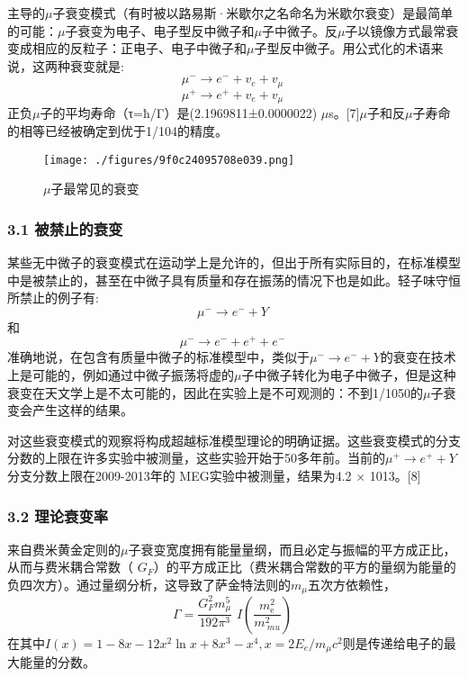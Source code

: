 主导的$\mu$子衰变模式（有时被以路易斯·米歇尔之名命名为米歇尔衰变）是最简单的可能：$\mu$子衰变为电子、电子型反中微子和$\mu$子中微子。反$\mu$子以镜像方式最常衰变成相应的反粒子：正电子、电子中微子和$\mu$子型反中微子。用公式化的术语来说，这两种衰变就是:
\begin{equation}
\mu^- \to e^-+v_e+v_\mu~
\end{equation}\begin{equation}
\mu^+ \to e^+ +v_e+v_\mu~
\end{equation}
正负$\mu$子的平均寿命（τ=ħ/Γ）是(2.1969811±0.0000022) $\mu$s。[7]$\mu$子和反$\mu$子寿命的相等已经被确定到优于1/104的精度。
\begin{figure}[ht]
\centering
\texttt{[image: ./figures/9f0c24095708e039.png]}
\caption{$\mu$子最常见的衰变} \label{fig_MZ_1}
\end{figure}
\subsubsection{3.1 被禁止的衰变}
某些无中微子的衰变模式在运动学上是允许的，但出于所有实际目的，在标准模型中是被禁止的，甚至在中微子具有质量和存在振荡的情况下也是如此。轻子味守恒所禁止的例子有:
\begin{equation}
\mu^- \to e^- + Y~
\end{equation}
和
\begin{equation}
\mu^- \to e^- +e^+ + e^-~
\end{equation}
准确地说，在包含有质量中微子的标准模型中，类似于$\mu^- \to e^- + Y$的衰变在技术上是可能的，例如通过中微子振荡将虚的$\mu$子中微子转化为电子中微子，但是这种衰变在天文学上是不太可能的，因此在实验上是不可观测的：不到1/1050的$\mu$子衰变会产生这样的结果。

对这些衰变模式的观察将构成超越标准模型理论的明确证据。这些衰变模式的分支分数的上限在许多实验中被测量，这些实验开始于50多年前。当前的$\mu^+ \to e^+ + Y$分支分数上限在2009-2013年的 MEG实验中被测量，结果为4.2 × 1013。[8]
\subsubsection{3.2 理论衰变率}
来自费米黄金定则的$\mu$子衰变宽度拥有能量量纲，而且必定与振幅的平方成正比，从而与费米耦合常数（  $G_F$）的平方成正比（费米耦合常数的平方的量纲为能量的负四次方）。通过量纲分析，这导致了萨金特法则的$m_\mu$五次方依赖性，
\begin{equation}
\Gamma=\frac{G^2_F m^5_\mu}{192\pi^3}\text{~}I\left({\frac{m_{\text {e}}^{2}}{m_{\ mu}^{2}}}\right)~
\end{equation}
在其中$I(x)=1-8x-12x^2\ln x+8x^3-x^4,x=2E_e/ m_\mu c^2$则是传递给电子的最大能量的分数。


